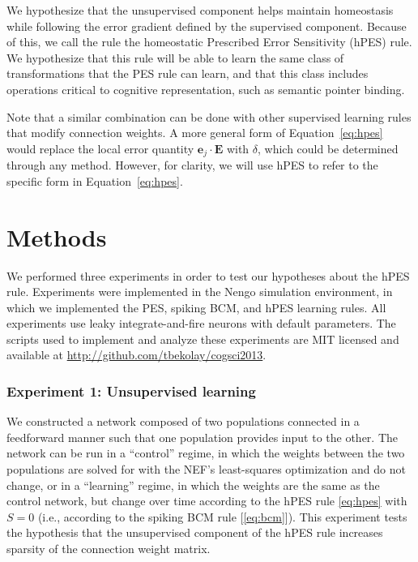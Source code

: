 \documentclass[10pt,letterpaper]{article}
\begin{document}
We hypothesize that the unsupervised
component helps maintain homeostasis
while following the error gradient defined
by the supervised component.
Because of this, we call the rule
the homeostatic Prescribed Error Sensitivity (hPES) rule.
We hypothesize that this rule will
be able to learn the same class
of transformations that the PES rule can learn,
and that this class includes operations
critical to cognitive representation,
such as semantic pointer binding.

Note that a similar combination can be done
with other supervised learning rules that
modify connection weights.
A more general form of Equation~\eqref{eq:hpes}
would replace the local error quantity
$\mathbf{e}_j \cdot \mathbf{E}$ with $\delta$,
which could be determined through any method.
However, for clarity, we will use hPES
to refer to the specific form in
Equation~\eqref{eq:hpes}.

\section{Methods}

We performed three experiments in order to
test our hypotheses about the hPES rule.
Experiments were implemented in the Nengo
simulation environment, in which we implemented
the PES, spiking BCM, and hPES learning rules.
All experiments use leaky integrate-and-fire
neurons with default parameters.
The scripts used to implement
and analyze these experiments
are MIT licensed and available at
\url{http://github.com/tbekolay/cogsci2013}.

\subsubsection{Experiment 1: Unsupervised learning}

We constructed a network composed of two populations
connected in a feedforward manner
such that one population provides input to the other.
The network can be run in a ``control'' regime,
in which the weights between the two populations
are solved for with the NEF's least-squares optimization
and do not change, or in a ``learning'' regime,
in which the weights are the same as the control network,
but change over time according to the hPES rule \eqref{eq:hpes}
with $S = 0$ (i.e., according to the spiking BCM rule [\ref{eq:bcm}]).
This experiment tests the hypothesis that the unsupervised
component of the hPES rule increases sparsity
of the connection weight matrix.
\end{document}
